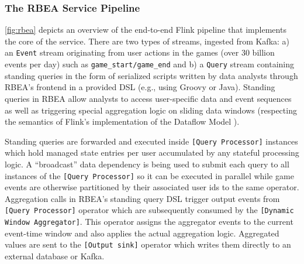 \subsubsection{The RBEA Service Pipeline}
\autoref{fig:rbea} depicts an overview of the end-to-end Flink pipeline that implements the core of the service. There are two types of streams, ingested from Kafka: a) an \texttt{Event} stream originating from  user actions in the games (over 30 billion events per day) such as \texttt{game\_start/game\_end} and b) a \texttt{Query} stream containing standing queries in the form of serialized scripts written by data analysts through RBEA's frontend in a provided DSL (e.g., using Groovy or Java). Standing queries in RBEA allow analysts to access user-specific data and event sequences as well as triggering special aggregation logic on sliding data windows (respecting the semantics of Flink's implementation of the Dataflow Model \cite{akidau2015dataflow}). 

Standing queries are forwarded and executed inside \texttt{[Query Processor]} instances which hold managed state entries per user accumulated by any stateful processing logic. A ``broadcast'' data dependency is being used to submit each query to all instances of the \texttt{[Query Processor]} so it can be executed in parallel while game events are otherwise partitioned by their associated user ids to the same operator. Aggregation calls in RBEA's standing query DSL trigger output events from \texttt{[Query Processor]} operator which are subsequently consumed by the \texttt{[Dynamic Window Aggregator]}. This operator assigns the aggregator events to the current event-time window and also applies the actual aggregation logic. Aggregated values are sent to the \texttt{[Output sink]} operator which writes them directly to an external database or Kafka. 


